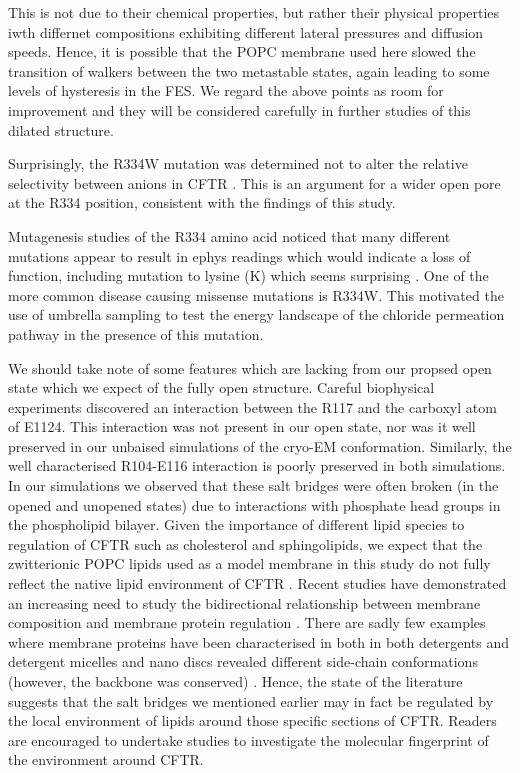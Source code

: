 This is not due to their chemical properties, but rather their physical properties iwth differnet compositions exhibiting different lateral pressures and diffusion speeds. Hence, it is possible that the POPC membrane used here slowed the transition of walkers between the two metastable states, again leading to some levels of hysteresis in the FES. We regard the above points as room for improvement and they will be considered carefully in further studies of this dilated structure.

Surprisingly, the R334W mutation was determined not to alter the relative selectivity between anions in CFTR \cite{sheppard1993}. This is an argument for a wider open pore at the R334 position, consistent with the findings of this study.

Mutagenesis studies of the R334 amino acid noticed that many different mutations appear to result in ephys readings which would indicate a loss of function, including mutation to lysine (K) which seems surprising \cite{ge2004, gong2004, linsdell2021}. One of the more common disease causing missense mutations is R334W. This motivated the use of umbrella sampling to test the energy landscape of the chloride permeation pathway in the presence of this mutation. 

We should take note of some features which are lacking from our propsed open state which we expect of the fully open structure. Careful biophysical experiments discovered an interaction between the R117 and the carboxyl atom of E1124. This interaction was not present in our open state, nor was it well preserved in our unbaised simulations of the cryo-EM conformation. Similarly, the well characterised R104-E116 interaction is poorly preserved in both simulations. In our simulations we observed that these salt bridges were often broken (in the opened and unopened states) due to interactions with phosphate head groups in the phospholipid bilayer. Given the importance of different lipid species to regulation of CFTR such as cholesterol and sphingolipids, we expect that the zwitterionic POPC lipids used as a model membrane in this study do not fully reflect the native lipid environment of CFTR \cite{farinha2018, cottrill2020}. Recent studies have demonstrated an increasing need to study the bidirectional relationship between membrane composition and membrane protein regulation \cite{lin2022, kapoor2021, cui2020}. There are sadly few examples where membrane proteins have been characterised in both in both detergents and detergent micelles and nano discs revealed different side-chain conformations (however, the backbone was conserved) \cite{autzen2019, gao2016, cheng2015}. Hence, the state of the literature suggests that the salt bridges we mentioned earlier may in fact be regulated by the local environment of lipids around those specific sections of CFTR. Readers are encouraged to undertake studies to investigate the molecular fingerprint of the environment around CFTR.

